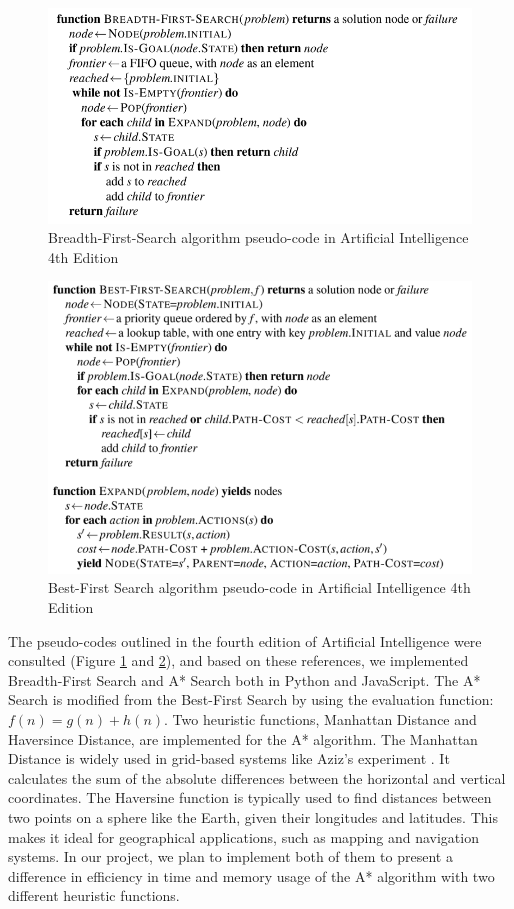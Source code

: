 \documentclass[12pt]{article}
\begin{document}
\begin{figure}[htbp]
\centering
\includegraphics[scale=0.6]{images/BFS.png}
\caption{Breadth-First-Search algorithm pseudo-code in Artificial Intelligence 4th Edition\cite{Russell_Norvig_2021}}
\label{fig: bfs}
\end{figure}

\begin{figure}[htbp]
\centering
\includegraphics[scale=0.55]{images/Astar.png}
\caption{Best-First Search algorithm pseudo-code in Artificial Intelligence 4th Edition\cite{Russell_Norvig_2021}}
\label{fig: BF}
\end{figure}


The pseudo-codes outlined in the fourth edition of Artificial Intelligence were consulted (Figure \ref{fig: bfs} and \ref{fig: BF}), and based on these references, we implemented Breadth-First Search and A* Search both in Python and JavaScript. The A* Search is modified from the Best-First Search by using the evaluation function: \(f(n) = g(n) + h(n)\). Two heuristic functions, Manhattan Distance and Haversince Distance, are implemented for the A* algorithm. The Manhattan Distance is widely used in grid-based systems like Aziz's experiment \cite{Aziz_Anusha_Sheikh_2022}. It calculates the sum of the absolute differences between the horizontal and vertical coordinates. The Haversine function is typically used to find distances between two points on a sphere like the Earth, given their longitudes and latitudes. This makes it ideal for geographical applications, such as mapping and navigation systems. In our project, we plan to implement both of them to present a difference in efficiency in time and memory usage of the A* algorithm with two different heuristic functions. 
\end{document}
